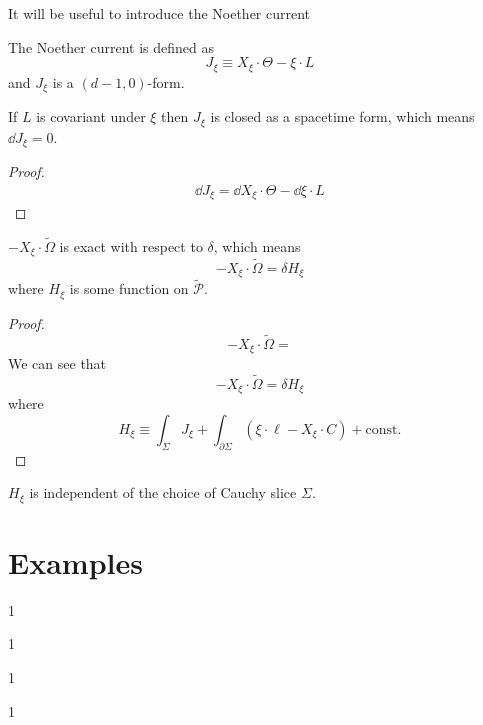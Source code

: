 \documentclass[10pt]{article}
\begin{document}
It will be useful to introduce the Noether current\cite{Iyer:1994ys}
\begin{definition}
    The Noether current is defined as
    \begin{equation}
        J_\xi\equiv X_\xi\cdot\Theta-\xi\cdot L
    \end{equation}
    and $J_\xi$ is a $(d-1,0)$-form.
\end{definition}

\begin{claim}
    If $L$ is covariant under $\xi$ then $J_{\xi}$ is closed as a spacetime form, which means $\dd{J_\xi}=0$.
\end{claim}
\begin{proof}
    \begin{equation}
        \begin{split}
            \dd{J_\xi}=\dd{X_\xi\cdot\Theta}-\dd{\xi\cdot L}
        \end{split}
    \end{equation}
\end{proof}


\begin{claim}
    $-X_\xi\cdot\tilde{\Omega}$ is exact with respect to $\delta$, which means
    \begin{equation}
        -X_\xi\cdot\tilde{\Omega}=\delta H_{\xi}
    \end{equation}
    where $H_{\xi}$ is some function on $\tilde{\mathcal{P}}$.
\end{claim}
\begin{proof}
    \begin{equation}
        -X_\xi\cdot\tilde{\Omega}=
    \end{equation}
    We can see that
    \begin{equation}
        -X_\xi\cdot\tilde{\Omega}=\delta H_\xi
    \end{equation}
    where
    \begin{equation}
        H_\xi\equiv\int_{\Sigma}J_{\xi}+\int_{\partial\Sigma}(\xi\cdot\ell-X_\xi\cdot C)+\text{const.}
    \end{equation}

\end{proof}

\begin{claim}
    $H_\xi$ is independent of the choice of Cauchy slice $\Sigma$.
\end{claim}

\section{Examples}
\begin{example}
    1
\end{example}

\begin{example}
    1
\end{example}

\begin{example}
    1
\end{example}

\begin{example}
    1
\end{example}

\clearpage


\end{document}
